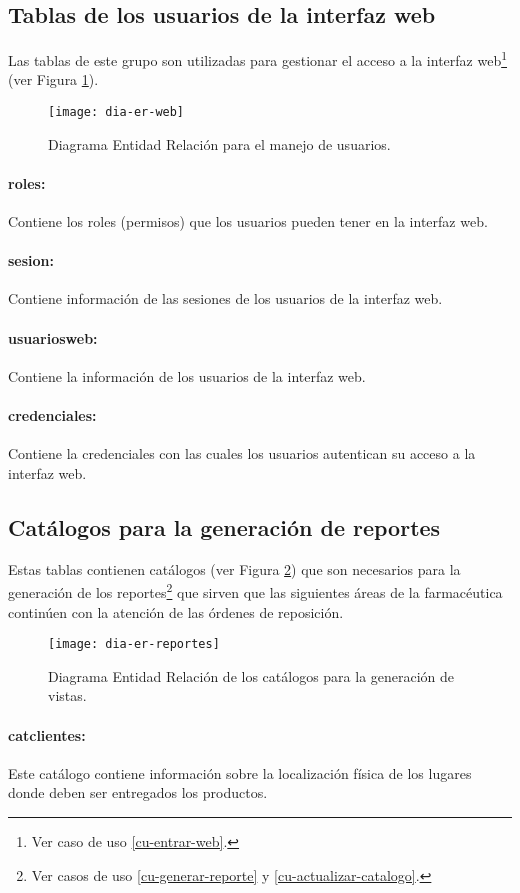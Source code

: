 \subsection{Tablas de los usuarios de la interfaz web}
Las tablas de este grupo son utilizadas para gestionar el acceso a la interfaz web\footnote{Ver caso de uso \ref{cu-entrar-web}.} (ver Figura \ref{fig:dia-er-web}).
\begin{figure}[h]
  \centering
  \texttt{[image: dia-er-web]} 
  \caption{Diagrama Entidad Relación para el manejo de usuarios.}
  \label{fig:dia-er-web}
\end{figure}
\paragraph{roles:}Contiene los roles (permisos) que los usuarios pueden tener en la interfaz web.
\paragraph{sesion:}Contiene información de las sesiones de los usuarios de la interfaz web.
\paragraph{usuarios{\textunderscore}web:} Contiene la información de los usuarios de la interfaz web.
\paragraph{credenciales:} Contiene la credenciales con las cuales los usuarios autentican su acceso a la interfaz web.


\subsection{Catálogos para la generación de reportes}
Estas tablas contienen catálogos (ver Figura \ref{fig:dia-er-reportes}) que son necesarios para la generación de los reportes\footnote{Ver casos de uso \ref{cu-generar-reporte} y \ref{cu-actualizar-catalogo}.} que sirven que las siguientes áreas de la farmacéutica continúen con la atención de las órdenes de reposición.
\begin{figure}[h]
  \centering
  \texttt{[image: dia-er-reportes]} 
  \caption{Diagrama Entidad Relación de los catálogos para la generación de vistas.}
  \label{fig:dia-er-reportes}
\end{figure}
\paragraph{cat{\textunderscore}clientes:} Este catálogo contiene información sobre la localización física de los lugares donde deben ser entregados los productos.
